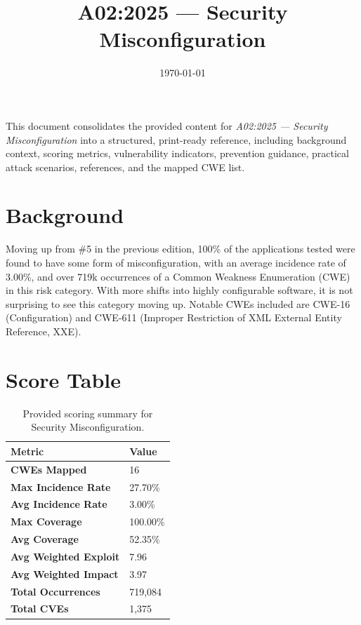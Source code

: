 \documentclass[11pt]{article}
\title{\textbf{A02:2025 — Security Misconfiguration}}
\date{\today}
\author{} %
\begin{document}
\maketitle

\begin{infobox}
This document consolidates the provided content for \textit{A02:2025 — Security Misconfiguration} into a structured, print-ready reference, including background context, scoring metrics, vulnerability indicators, prevention guidance, practical attack scenarios, references, and the mapped CWE list.
\end{infobox}

\tableofcontents
\newpage

\section{Background}
Moving up from \#5 in the previous edition, 100\% of the applications tested were found to have some form of misconfiguration, with an average incidence rate of 3.00\%, and over 719k occurrences of a Common Weakness Enumeration (CWE) in this risk category. With more shifts into highly configurable software, it is not surprising to see this category moving up. Notable CWEs included are CWE-16 (Configuration) and CWE-611 (Improper Restriction of XML External Entity Reference, XXE).

\section{Score Table}
\begin{table}[h!]
\centering
\renewcommand{\arraystretch}{1.2}
\begin{tabular}{@{}>{\bfseries}p{4.6cm}p{3.4cm}@{}}
\toprule
Metric & Value \\
\midrule
CWEs Mapped & 16 \\
Max Incidence Rate & 27.70\% \\
Avg Incidence Rate & 3.00\% \\
Max Coverage & 100.00\% \\
Avg Coverage & 52.35\% \\
Avg Weighted Exploit & 7.96 \\
Avg Weighted Impact & 3.97 \\
Total Occurrences & 719,084 \\
Total CVEs & 1,375 \\
\bottomrule
\end{tabular}
\caption{Provided scoring summary for Security Misconfiguration.}
\end{table}
\end{document}
